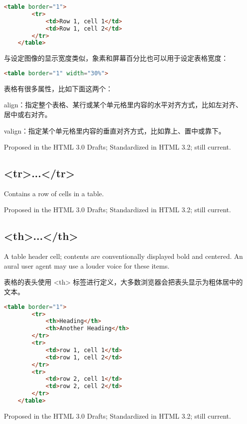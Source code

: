 \begin{lstlisting}[language=HTML]
	<table border="1">
		<tr>
			<td>Row 1, cell 1</td>
			<td>Row 1, cell 2</td>
		</tr>
	</table>
\end{lstlisting}


与设定图像的显示宽度类似，象素和屏幕百分比也可以用于设定表格宽度：

\begin{lstlisting}[language=HTML]
	<table border="1" width="30%">
\end{lstlisting}

表格有很多属性，比如下面这两个：

\begin{compactitem}
\item align：指定整个表格、某行或某个单元格里内容的水平对齐方式，比如左对齐、居中或右对齐。
\item valign：指定某个单元格里内容的垂直对齐方式，比如靠上、置中或靠下。
\end{compactitem}

Proposed in the HTML 3.0 Drafts; Standardized in HTML 3.2; still current.

\subsection{<tr>...</tr>}

Contains a row of cells in a table.

Proposed in the HTML 3.0 Drafts; Standardized in HTML 3.2; still current.

\subsection{<th>...</th>}

A table header cell; contents are conventionally displayed bold and centered. An aural user agent may use a louder voice for these items.

表格的表头使用 <th> 标签进行定义，大多数浏览器会把表头显示为粗体居中的文本。

\begin{lstlisting}[language=HTML]
	<table border="1">
		<tr>
			<th>Heading</th>
			<th>Another Heading</th>
		</tr>
		<tr>
			<td>row 1, cell 1</td>
			<td>row 1, cell 2</td>
		</tr>
		<tr>
			<td>row 2, cell 1</td>
			<td>row 2, cell 2</td>
		</tr>
	</table>
\end{lstlisting}

Proposed in the HTML 3.0 Drafts; Standardized in HTML 3.2; still current.

